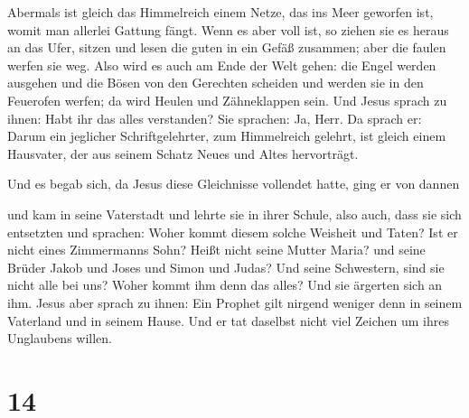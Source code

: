  Abermals ist gleich das Himmelreich einem Netze, das ins
Meer geworfen ist, womit man allerlei Gattung fängt. 
Wenn es aber voll ist, so ziehen sie es heraus an das Ufer, sitzen und
lesen die guten in ein Gefäß zusammen; aber die faulen werfen sie weg.
 Also wird es auch am Ende der Welt gehen: die Engel
werden ausgehen und die Bösen von den Gerechten scheiden 
und werden sie in den Feuerofen werfen; da wird Heulen und Zähneklappen
sein.  Und Jesus sprach zu ihnen: Habt ihr das alles
verstanden? Sie sprachen: Ja, Herr.  Da sprach er: Darum
ein jeglicher Schriftgelehrter, zum Himmelreich gelehrt, ist gleich
einem Hausvater, der aus seinem Schatz Neues und Altes hervorträgt.

 Und es begab sich, da Jesus diese Gleichnisse vollendet
hatte, ging er von dannen

 und kam in seine Vaterstadt und lehrte sie in ihrer
Schule, also auch, dass sie sich entsetzten und sprachen: Woher kommt
diesem solche Weisheit und Taten?  Ist er nicht eines
Zimmermanns Sohn? Heißt nicht seine Mutter Maria? und seine Brüder Jakob
und Joses und Simon und Judas?  Und seine Schwestern,
sind sie nicht alle bei uns? Woher kommt ihm denn das alles?
 Und sie ärgerten sich an ihm. Jesus aber sprach zu
ihnen: Ein Prophet gilt nirgend weniger denn in seinem Vaterland und in
seinem Hause.  Und er tat daselbst nicht viel Zeichen um
ihres Unglaubens willen.

\hypertarget{section-13}{%
\section{14}\label{section-13}}

